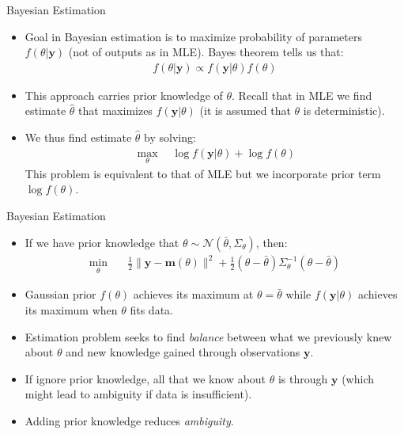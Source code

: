 \documentclass[9pt]{beamer}
\begin{document}
%
\begin{frame}{Bayesian Estimation}

\begin{itemize}
\setlength{\itemsep}{10pt}
\item Goal in Bayesian estimation is to maximize probability of parameters $f(\theta|\mathbf{y})$ (not of outputs as in MLE). Bayes theorem tells us that:
\begin{align*}
f(\theta|\mathbf{y})\propto f(\mathbf{y}|\theta)f(\theta)
\end{align*}
\item This approach carries prior knowledge of $\theta$.  Recall that in MLE we find estimate $\hat{\theta}$ that maximizes $f(\mathbf{y}|\theta)$ (it is assumed that $\theta$ is deterministic). 

\item We thus find estimate $\hat{\theta}$ by solving:
\begin{align*}
\max_\theta\quad  \log f(\mathbf{y}|\theta)+\log f(\theta)
\end{align*}
This problem is equivalent to that of MLE but we incorporate prior term $\log f(\theta)$. 
\end{itemize}

\end{frame}

%
\begin{frame}{Bayesian Estimation}

\begin{itemize}
\setlength{\itemsep}{10pt}
\item If we have prior knowledge that $\theta\sim \mathcal{N}(\bar{\theta},\Sigma_\theta)$, then: 
\begin{align*}
\min_{\theta}& \quad \frac{1}{2}\|\mathbf{y}- \mathbf{m}(\theta)\|^2+\frac{1}{2}(\theta-\bar{\theta})\Sigma_\theta^{-1}(\theta-\bar{\theta})  
\end{align*}
\item Gaussian prior $f(\theta)$ achieves its maximum at $\theta=\bar{\theta}$ while $f(\mathbf{y}|\theta)$ achieves its maximum when $\theta$ fits data. 
\item Estimation problem seeks to find {\em balance} between what we previously knew about $\theta$ and new knowledge gained through observations $\mathbf{y}$. 
\item If ignore prior knowledge, all that we know about $\theta$ is through $\mathbf{y}$ (which might lead to ambiguity if data is insufficient). 
\item Adding prior knowledge reduces {\em ambiguity}. 
\end{itemize}

\end{frame}
\end{document}
